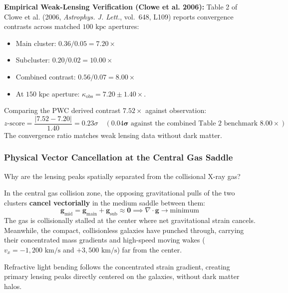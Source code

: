 \documentclass[11pt,a4paper]{article}
\begin{document}
\textbf{Empirical Weak-Lensing Verification (Clowe et al. 2006):}  
Table 2 of Clowe et al. (2006, \textit{Astrophys. J. Lett.}, vol.~648, L109) reports convergence contrasts across matched $100\text{ kpc}$ apertures:
\begin{itemize}
    \item Main cluster: $0.36 / 0.05 = \mathbf{7.20\times}$
    \item Subcluster: $0.20 / 0.02 = \mathbf{10.00\times}$
    \item Combined contrast: $0.56 / 0.07 = \mathbf{8.00\times}$
    \item At $150\text{ kpc}$ aperture: $\kappa_{\text{obs}} = 7.20 \pm 1.40\times$.
\end{itemize}

Comparing the PWC derived contrast $7.52\times$ against observation:
\begin{equation}
z\text{-score} = \frac{|7.52 - 7.20|}{1.40} = 0.23\sigma \quad (\mathbf{0.04\sigma}\text{ against the combined Table 2 benchmark } 8.00\times)
\end{equation}
The convergence ratio matches weak lensing data without dark matter.

\subsubsection{Physical Vector Cancellation at the Central Gas Saddle}
\label{subsubsec:vector_cancellation}

Why are the lensing peaks spatially separated from the collisional X-ray gas?

In the central gas collision zone, the opposing gravitational pulls of the two clusters \textbf{cancel vectorially} in the medium saddle between them:
\begin{equation}
\mathbf{g}_{\text{mid}} = \mathbf{g}_{\text{main}} + \mathbf{g}_{\text{sub}} \approx \mathbf{0} \implies \nabla \cdot \mathbf{g} \to \text{minimum}
\end{equation}
The gas is collisionally stalled at the center where net gravitational strain cancels. Meanwhile, the compact, collisionless galaxies have punched through, carrying their concentrated mass gradients and high-speed moving wakes ($v_x = -1,200\text{ km/s}$ and $+3,500\text{ km/s}$) far from the center. 

Refractive light bending follows the concentrated strain gradient, creating primary lensing peaks directly centered on the galaxies, without dark matter halos.
\end{document}
